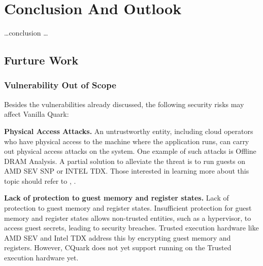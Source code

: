 \chapter{Conclusion And Outlook}
\label{sec:conclusion}



\ldots conclusion \ldots


\section{Furture Work}
\subsection{Vulnerability Out of Scope}
Besides the vulnerabilities already discussed, the following security risks may affect Vanilla Quark:


\textbf{Physical Access Attacks.} An untrustworthy entity, including cloud operators who have physical access to the machine where the application runs, can carry out physical access attacks on the system. One example of such attacks 
is Offline DRAM Analysis. A partial solution to alleviate the threat is to run guests on AMD SEV SNP or INTEL TDX.  Those interested in learning more about this topic should refer to \cite*{SEV_SNP_white_book}, \cite*{DBLP:journals/corr/abs-2303-15540}.


\textbf{Lack of protection to guest memory and register states.} Lack of protection to guest memory and register states.  Insufficient protection for guest memory and register states allows non-trusted entities, such as a hypervisor, to access guest secrets, leading to security breaches. 
Trusted execution hardware like AMD SEV\cite*{SEV_SNP_white_book} and Intel TDX\cite*{Intel_tdx_whitepaper} address this by encrypting guest memory and registers. However, CQuark does not yet support running on the Trusted execution hardware yet.


